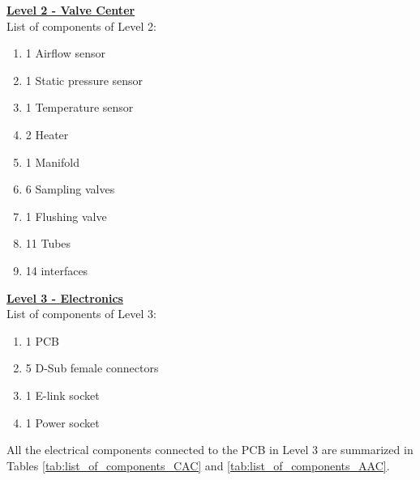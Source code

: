 \documentclass[a4paper,12pt,oneside]{article}
\begin{document}
\begin{appendices}
\textbf{\underline{Level 2 - Valve Center}}
\\
List of components of Level 2:

\begin{enumerate}[label=\Alph*.]
    \item 1 Airflow sensor
    \item 1 Static pressure sensor
    \item 1 Temperature sensor
    \item 2 Heater
    \item 1 Manifold
    \item 6 Sampling valves
    \item 1 Flushing valve
    \item 11 Tubes
    \item 14 interfaces
\end{enumerate}

\textbf{\underline{Level 3 - Electronics}}
\\
List of components of Level 3:
\begin{enumerate}[label=\Alph*.]
    \item 1 PCB
    \item 5 D-Sub female connectors
    \item 1 E-link socket
    \item 1 Power socket
\end{enumerate}
All the electrical components connected to the PCB in Level 3 are summarized in Tables \ref{tab:list_of_components_CAC} and \ref{tab:list_of_components_AAC}. 
\begin{table}[H]
\centering


\end{table}
\end{appendices}
\end{document}
